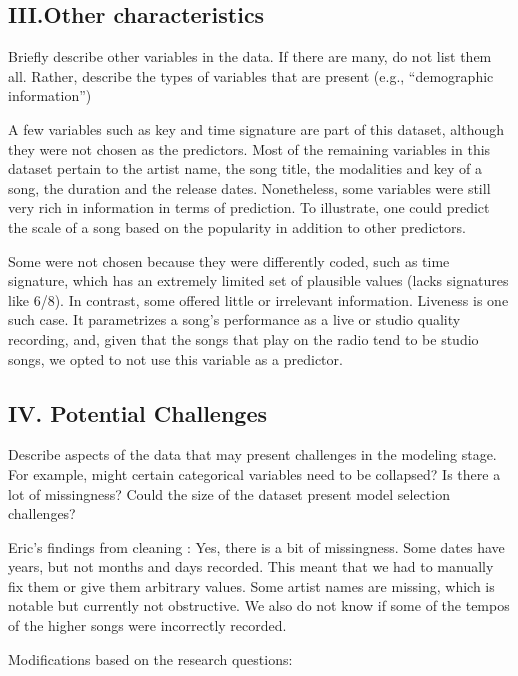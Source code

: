 \documentclass[
]{article}
\begin{document}
\hypertarget{iii.other-characteristics}{%
\subsection{III.Other characteristics}\label{iii.other-characteristics}}

Briefly describe other variables in the data. If there are many, do not
list them all. Rather, describe the types of variables that are present
(e.g., ``demographic information'')

A few variables such as key and time signature are part of this dataset,
although they were not chosen as the predictors. Most of the remaining
variables in this dataset pertain to the artist name, the song title,
the modalities and key of a song, the duration and the release dates.
Nonetheless, some variables were still very rich in information in terms
of prediction. To illustrate, one could predict the scale of a song
based on the popularity in addition to other predictors.

Some were not chosen because they were differently coded, such as time
signature, which has an extremely limited set of plausible values (lacks
signatures like 6/8). In contrast, some offered little or irrelevant
information. Liveness is one such case. It parametrizes a song's
performance as a live or studio quality recording, and, given that the
songs that play on the radio tend to be studio songs, we opted to not
use this variable as a predictor.

\hypertarget{iv.-potential-challenges}{%
\subsection{IV. Potential Challenges}\label{iv.-potential-challenges}}

Describe aspects of the data that may present challenges in the modeling
stage. For example, might certain categorical variables need to be
collapsed? Is there a lot of missingness? Could the size of the dataset
present model selection challenges?

Eric's findings from cleaning : Yes, there is a bit of missingness. Some
dates have years, but not months and days recorded. This meant that we
had to manually fix them or give them arbitrary values. Some artist
names are missing, which is notable but currently not obstructive. We
also do not know if some of the tempos of the higher songs were
incorrectly recorded.

Modifications based on the research questions:
\end{document}
